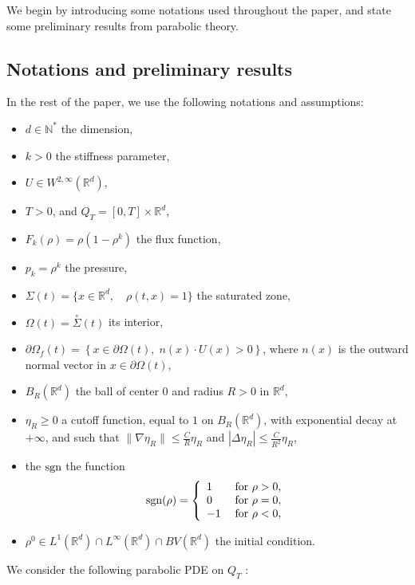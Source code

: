 \documentclass[11pt,twoside]{article}
\numberwithin{equation}{section}
\newcommand{\R}{\mathbb{R}}
\newcommand{\N}{\mathbb{N}}
\newcommand {\sgn} { {\rm sgn} }
\newcommand {\p}   {\partial}
\begin{document}
We begin by introducing some notations used throughout the paper, and state some preliminary results from parabolic theory.

\subsection{Notations and preliminary results}

In the rest of the paper, we use the following notations and assumptions:

\begin{itemize}[label=$\bullet$]

\item $d \in \N^*$ the dimension,
\item $k > 0$ the stiffness parameter,
\item $U\in W^{2,\infty}(\R^d),$
\item $T > 0$, and $Q_T = [0,T] \times \R^d$,
\item $F_k(\rho) = \rho(1-\rho^k)$ the flux function,
\item $p_k = \rho^k$ the pressure,
\item $\Sigma(t) = \{x\in \R^d, \quad\rho(t,x) = 1\}$ the saturated zone,
\item $\Omega(t) = \overset{\circ}{\Sigma}(t)$ its interior,
\item $\p \Omega_f(t) = \left\{ x \in \p \Omega(t), \; n(x)\cdot U(x) > 0 \right \}$, where $n(x)$ is the outward normal vector in $x \in \p \Omega(t)$,
\item $B_R(\R^d)$ the ball of center $0$ and radius $R >0$ in $\R^d$,
\item $\eta_R \geq 0$ a cutoff function, equal to $1$ on $B_R(\R^d)$, with exponential decay at $+ \infty$, and such that $\| \nabla \eta_R \| \le \frac{C}{R}\eta_R$ and $| \Delta \eta_R| \le \frac{C}{R^2}\eta_R$,
\item the $\sgn$ the function
\begin{align*}
\sgn(\rho) = \left\{
\begin{array}{ll}
1 & \text{for } \rho > 0, \\
0 & \text{for } \rho = 0, \\
-1 \; & \text{for } \rho < 0,
\end{array}
\right.
\end{align*}
\item $\rho^0 \in L^1(\R^d) \cap L^\infty(\R^d)\cap BV(\R^d)$ the initial condition.

\end{itemize}
We consider the following parabolic PDE on $Q_T$ :
\end{document}
